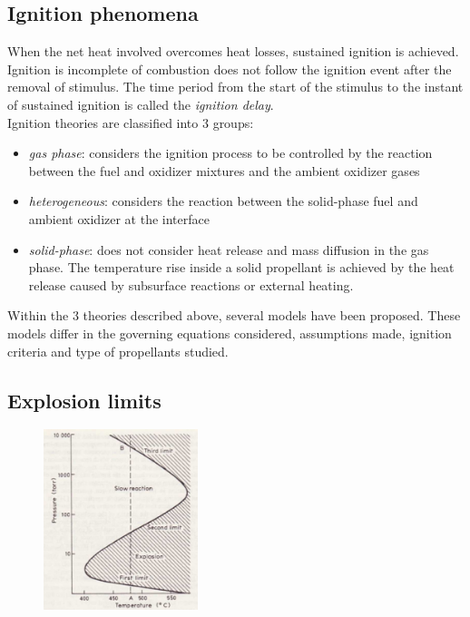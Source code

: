 \documentclass[12pt]{article}
\begin{document}
\subsection{Ignition phenomena}

When the net heat involved overcomes heat losses, sustained ignition is achieved. Ignition is incomplete of combustion does not follow the ignition event after the removal of stimulus. The time period from the start of the stimulus to the instant of sustained ignition is called the \textit{ignition delay}.\\
Ignition theories are classified into 3 groups:

\begin{itemize}
    \item \textit{gas phase}: considers the ignition process to be controlled by the reaction between the fuel and oxidizer mixtures and the ambient oxidizer gases
    \item \textit{heterogeneous}: considers the reaction between the solid-phase fuel and ambient oxidizer at the interface
    \item \textit{solid-phase}: does not consider heat release and mass diffusion in the gas phase. The temperature rise inside a solid propellant is achieved by the heat release caused by subsurface reactions or external heating.
\end{itemize}

Within the 3 theories described above, several models have been proposed. These models differ in the governing equations considered, assumptions made, ignition criteria and type of propellants studied.

\subsection{Explosion limits}

\begin{figure}[!ht]
\centering
\includegraphics[width=0.4\textwidth]{figures/explosion.png}
\end{figure}
\end{document}
